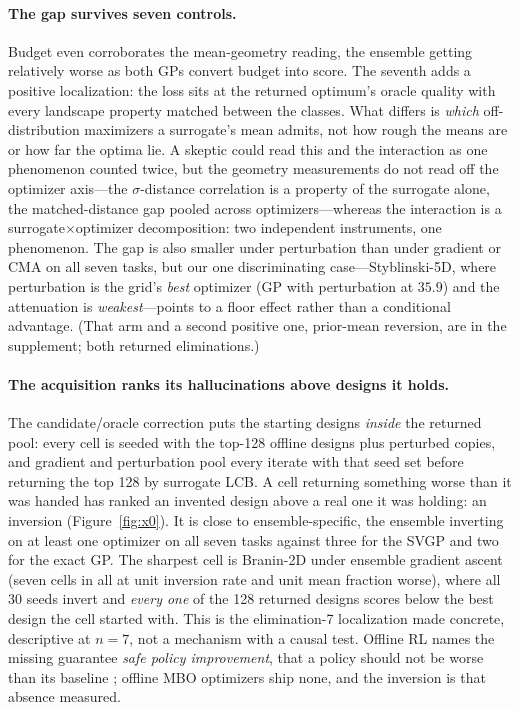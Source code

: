 \documentclass[letterpaper]{article} %
\theoremstyle{plain}
\newcommand{\mdemph}[1]{\emph{#1}}
\begin{document}
\paragraph{The gap survives seven controls.} Budget even corroborates the mean-geometry reading, the ensemble getting relatively worse as both GPs convert budget into score. The seventh adds a positive localization: the loss sits at the returned optimum's oracle quality with every landscape property matched between the classes. What differs is \mdemph{which} off-distribution maximizers a surrogate's mean admits, not how rough the means are or how far the optima lie. A skeptic could read this and the interaction as one phenomenon counted twice, but the geometry measurements do not read off the optimizer axis---the $\sigma$-distance correlation is a property of the surrogate alone, the matched-distance gap pooled across optimizers---whereas the interaction is a surrogate$\times$optimizer decomposition: two independent instruments, one phenomenon. The gap is also smaller under perturbation than under gradient or CMA on all seven tasks, but our one discriminating case---Styblinski-5D, where perturbation is the grid's \mdemph{best} optimizer (GP with perturbation at $35.9$) and the attenuation is \mdemph{weakest}---points to a floor effect rather than a conditional advantage. (That arm and a second positive one, prior-mean reversion, are in the supplement; both returned eliminations.)

\paragraph{The acquisition ranks its hallucinations above designs it holds.} The candidate/oracle correction puts the starting designs \mdemph{inside} the returned pool: every cell is seeded with the top-128 offline designs plus perturbed copies, and gradient and perturbation pool every iterate with that seed set before returning the top 128 by surrogate LCB. A cell returning something worse than it was handed has ranked an invented design above a real one it was holding: an inversion (Figure~\ref{fig:x0}). It is close to ensemble-specific, the ensemble inverting on at least one optimizer on all seven tasks against three for the SVGP and two for the exact GP. The sharpest cell is Branin-2D under ensemble gradient ascent (seven cells in all at unit inversion rate and unit mean fraction worse), where all 30 seeds invert and \mdemph{every one} of the 128 returned designs scores below the best design the cell started with. This is the elimination-7 localization made concrete, descriptive at $n{=}7$, not a mechanism with a causal test. Offline RL names the missing guarantee \mdemph{safe policy improvement}, that a policy should not be worse than its baseline \citep{thomas2015hcpi,laroche2019spibb,kumar2020cql}; offline MBO optimizers ship none, and the inversion is that absence measured.
\end{document}
